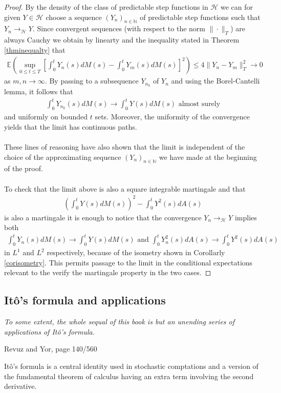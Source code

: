 \documentclass[11pt,a4paper, final]{article}
\begin{document}
\begin{proof}
By the density of the class of predictable step functions in $\mathcal{H}$ we can  for given $Y \in \mathcal{H}$ choose a sequence $(Y_n)_{n \in \mathbb{N}}$ of predictable step functions such that $Y_n \to_\mathcal{H} Y$. Since convergent sequences (with respect to the norm $\| \cdot \|_T$) are always Cauchy we obtain by linearty and the inequality stated in Theorem \ref{thminequalty} that
\begin{align*}
\mathbb{E} \left( \sup_{0 \leq t \leq T} \left[ \int_0^t Y_n(s) dM(s) - \int_0^t Y_m(s) dM(s) \right]^2 \right) \leq 4 \| Y_n -Y_m \|_T^2 \to 0 
\end{align*}
as $m,n \to \infty$. By passing to a subsequence $Y_{n_k}$ of $Y_n$ and using the Borel-Cantelli lemma, it follows that \begin{align*}
\int_0^t Y_{n_k} (s) dM(s) \to \int_0^t Y(s) dM(s) \text{ almost surely}
\end{align*}
and uniformly on bounded $t$ sets. Moreover, the uniformity of the convergence yields that the limit has continuous paths. 
\\\\
These lines of reasoning have also shown that the limit is independent of the choice of the approximating sequence $(Y_n)_{n \in \mathbb{N}}$ we have made at the beginning of the proof. 
\\\\
To check that the limit above is also a square integrable martingale and that 
\begin{align*}
\left( \int_0^t Y(s) dM(s) \right)^2 - \int_0^t Y^2(s) dA(s)
\end{align*}
is also a martingale it is enough to notice that the convergence $Y_n \to_\mathcal{H} Y$ implies both
\begin{align*}
\int_0^t Y_n(s) dM(s) \to \int_0^t Y(s) dM(s) \text{ and } \int_0^t Y_n^2(s)dA(s) \to \int_0^t Y^2(s) dA(s)
\end{align*}
in $L^1$ and $L^2$ respectively, because of the isometry shown in Corollarly \ref{corisometry}. This permits passage to the limit in the conditional expectations relevant to the verify the martingale property in the two cases. 
\end{proof}
\newpage
\subsection{Itô's formula and applications}
\epigraph{\textit{To some extent, the whole sequal of this book is but an unending series of applications of Itô's formula.}}{Revuz and Yor, page 140/560}
\noindent Itô's formula is a central identity used in stochastic comptations and a version of the fundamental theorem of calculus having an extra term involving the second derivative. 
\end{document}

